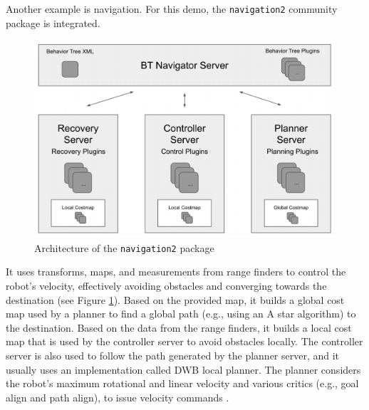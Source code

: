 Another example is navigation.
For this demo, the \texttt{navigation2} community package is integrated.  
\begin{figure}[H]
    \centering
    \includegraphics[width=\textwidth]{demos/figures/navigation_overview.png}
    \caption[Architecture of the \texttt{navigation2} package]{Architecture of the \texttt{navigation2} package\footnotemark}
    \label{fig:demos:navigation_overview}
\end{figure}


It uses transforms, maps, and measurements from range finders to control the robot's velocity, effectively avoiding obstacles and converging towards the destination (see Figure \ref{fig:demos:navigation_overview}).
Based on the provided map, it builds a global cost map used by a planner to find a global path (e.g., using an A star algorithm) to the destination.
Based on the data from the range finders, it builds a local cost map that is used by the controller server to avoid obstacles locally.
The controller server is also used to follow the path generated by the planner server, and it usually uses an implementation called DWB local planner.
The planner considers the robot's maximum rotational and linear velocity and various critics (e.g., goal align and path align), to issue velocity commands \cite{macenski_marathon_2020}. 

